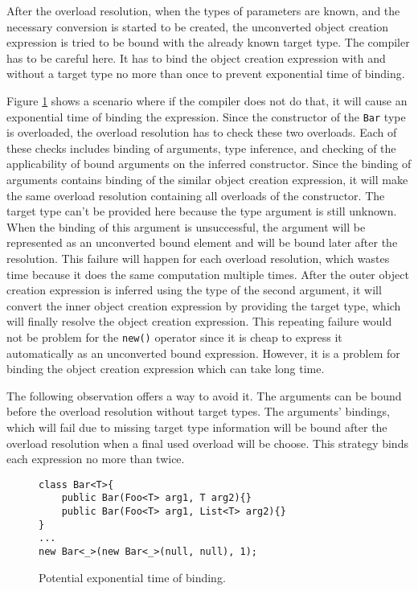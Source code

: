 After the overload resolution, when the types of parameters are known, and the necessary conversion is started to be created, the unconverted object creation expression is tried to be bound with the already known target type. 
The compiler has to be careful here. 
It has to bind the object creation expression with and without a target type no more than once to prevent exponential time of binding.
\par
Figure \ref{img61:exp} shows a scenario where if the compiler does not do that, it will cause an exponential time of binding the expression. 
Since the constructor of the \texttt{Bar} type is overloaded, the overload resolution has to check these two overloads. 
Each of these checks includes binding of arguments, type inference, and checking of the applicability of bound arguments on the inferred constructor. 
Since the binding of arguments contains binding of the similar object creation expression, it will make the same overload resolution containing all overloads of the constructor. 
The target type can’t be provided here because the type argument is still unknown. 
When the binding of this argument is unsuccessful, the argument will be represented as an unconverted bound element and will be bound later after the resolution. 
This failure will happen for each overload resolution, which wastes time because it does the same computation multiple times. 
After the outer object creation expression is inferred using the type of the second argument, it will convert the inner object creation expression by providing the target type, which will finally resolve the object creation expression. 
This repeating failure would not be problem for the \texttt{new()} operator since it is cheap to express it automatically as an unconverted bound expression.
However, it is a problem for binding the object creation expression which can take long time.
\par
The following observation offers a way to avoid it.
The arguments can be bound before the overload resolution without target types.
The arguments' bindings, which will fail due to missing target type information will be bound after the overload resolution when a final used overload will be choose.
This strategy binds each expression no more than twice. 
\begin{figure}[h!]
\begin{lstlisting}[style=csharp, mathescape=true]
class Bar<T>{
    public Bar(Foo<T> arg1, T arg2){}
    public Bar(Foo<T> arg1, List<T> arg2){}
}
...
new Bar<_>(new Bar<_>(null, null), 1);
\end{lstlisting}
\caption{Potential exponential time of binding.}
\label{img61:exp}
\end{figure}

